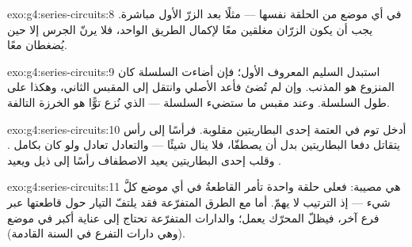\begin{solution}{exo:g4:series-circuits:8}
في أي موضع من الحلقة نفسها --- مثلًا بعد الزرّ الأول مباشرة.
 يجب أن يكون الزرّان مغلقين معًا لإكمال الطريق
الواحد، فلا يرنّ الجرس إلا حين يُضغطان معًا.
\end{solution}

\begin{solution}{exo:g4:series-circuits:9}
استبدل  السليم المعروف  الأول؛ فإن أضاءت
السلسلة كان  المنزوع هو المذنب. وإن لم تُضئ فأعد الأصلي
وانتقل إلى المقبس الثاني، وهكذا على طول السلسلة. وعند مقبس ما
ستضيء السلسلة ---  الذي نُزع توًّا هو الخرزة التالفة.
\end{solution}

\begin{solution}{exo:g4:series-circuits:10}
أدخل توم في العتمة إحدى البطاريتين مقلوبة. فرأسًا إلى رأس
يتقاتل دفعا البطاريتين بدل أن يصطفّا، فلا ينال  شيئًا
--- والتعادل تعادل ولو كان بكامل . وقلب إحدى البطاريتين
يعيد الاصطفاف رأسًا إلى ذيل ويعيد .
\end{solution}

\begin{solution}{exo:g4:series-circuits:11}
هي مصيبة: فعلى حلقة واحدة تأمر القاطعةُ في أي موضع كلَّ شيء ---
إذ الترتيب لا يهمّ. أما مع الطرق المتفرّعة فقد يلتفّ التيار حول
قاطعتها عبر فرع آخر، فيظلّ المحرّك يعمل؛ والدارات المتفرّعة
تحتاج إلى عناية أكبر في موضع  (وهي دارات التفرع في السنة
القادمة).
\end{solution}
